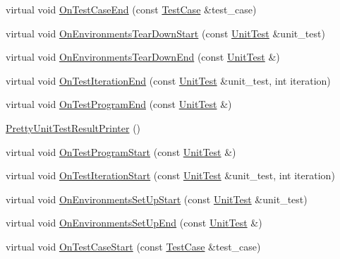 \begin{DoxyCompactItemize}
virtual void \hyperlink{classtesting_1_1internal_1_1PrettyUnitTestResultPrinter_adecad7fba2c2b8083a93a152046f06dd}{\-On\-Test\-Case\-End} (const \hyperlink{classtesting_1_1TestCase}{\-Test\-Case} \&test\-\_\-case)
\item 
virtual void \hyperlink{classtesting_1_1internal_1_1PrettyUnitTestResultPrinter_a7f429e4591b590d3429263c7c5ab0ceb}{\-On\-Environments\-Tear\-Down\-Start} (const \hyperlink{classtesting_1_1UnitTest}{\-Unit\-Test} \&unit\-\_\-test)
\item 
virtual void \hyperlink{classtesting_1_1internal_1_1PrettyUnitTestResultPrinter_af00cb6141021245e02c511782ce66b46}{\-On\-Environments\-Tear\-Down\-End} (const \hyperlink{classtesting_1_1UnitTest}{\-Unit\-Test} \&)
\item 
virtual void \hyperlink{classtesting_1_1internal_1_1PrettyUnitTestResultPrinter_aa21b349a51378e47877ee6d153c37116}{\-On\-Test\-Iteration\-End} (const \hyperlink{classtesting_1_1UnitTest}{\-Unit\-Test} \&unit\-\_\-test, int iteration)
\item 
virtual void \hyperlink{classtesting_1_1internal_1_1PrettyUnitTestResultPrinter_a79232f629150d6a1e560f6729271e729}{\-On\-Test\-Program\-End} (const \hyperlink{classtesting_1_1UnitTest}{\-Unit\-Test} \&)
\item 
\hyperlink{classtesting_1_1internal_1_1PrettyUnitTestResultPrinter_a7a5522d7d82830d114fb19dedeff3d2f}{\-Pretty\-Unit\-Test\-Result\-Printer} ()
\item 
virtual void \hyperlink{classtesting_1_1internal_1_1PrettyUnitTestResultPrinter_a9d43d6e5c4c37ade824998de2d83bd20}{\-On\-Test\-Program\-Start} (const \hyperlink{classtesting_1_1UnitTest}{\-Unit\-Test} \&)
\item 
virtual void \hyperlink{classtesting_1_1internal_1_1PrettyUnitTestResultPrinter_aea5c56c29cc19b7d811a02ea93f0c440}{\-On\-Test\-Iteration\-Start} (const \hyperlink{classtesting_1_1UnitTest}{\-Unit\-Test} \&unit\-\_\-test, int iteration)
\item 
virtual void \hyperlink{classtesting_1_1internal_1_1PrettyUnitTestResultPrinter_a54e314e87dd4f40cf054af17214fe5d8}{\-On\-Environments\-Set\-Up\-Start} (const \hyperlink{classtesting_1_1UnitTest}{\-Unit\-Test} \&unit\-\_\-test)
\item 
virtual void \hyperlink{classtesting_1_1internal_1_1PrettyUnitTestResultPrinter_a4ab2823e779a053ad65cf7f01bb76b54}{\-On\-Environments\-Set\-Up\-End} (const \hyperlink{classtesting_1_1UnitTest}{\-Unit\-Test} \&)
\item 
virtual void \hyperlink{classtesting_1_1internal_1_1PrettyUnitTestResultPrinter_adeff7f41a379b240b282fe511ff8bcbf}{\-On\-Test\-Case\-Start} (const \hyperlink{classtesting_1_1TestCase}{\-Test\-Case} \&test\-\_\-case)

\end{DoxyCompactItemize}
